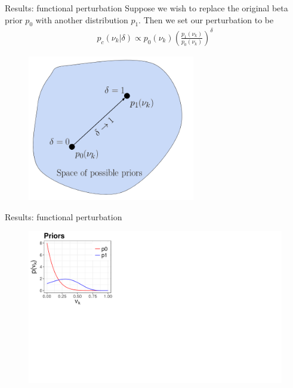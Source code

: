 \documentclass[10pt]{beamer}\usepackage[]{graphicx}\usepackage[]{color}
\newenvironment{knitrout}{}{} %
\begin{document}
\begin{frame}{Results: functional perturbation}
Suppose we wish to replace the original beta prior $p_0$ with another distribution $p_1$. Then we set our perturbation to be
\begin{align*}
p_c(\nu_k \vert \delta) \propto p_{0}(\nu_k)\left(\frac{p_1(\nu_k)}{p_0(\nu_k)}\right)^\delta
\end{align*}
\vspace{-0.25in}
\begin{figure}[!h]
\centering
\includegraphics[width = 0.65\textwidth]{./images/functional_perturbation.png}
\setlength{\textfloatsep}{-10pt}
\end{figure}

\end{frame}

\begin{frame}{Results: functional perturbation}
\begin{figure}
\centering
\begin{knitrout}
\color{fgcolor}
{\centering \includegraphics[width=0.98\linewidth,height=0.588\linewidth]{masked_results_fig/fun_sens_masked_1} 
}
\end{knitrout}
\end{figure}
\end{frame}
\end{document}
